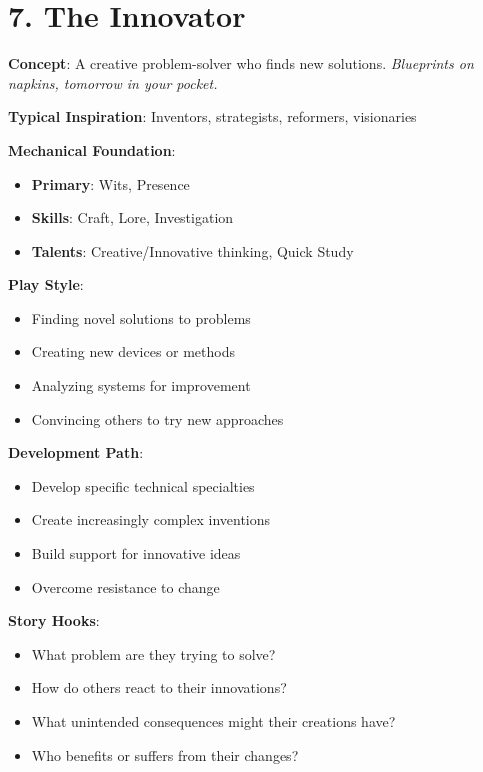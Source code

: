 \section{7. The Innovator}

\textbf{Concept}: A creative problem-solver who finds new solutions. \emph{Blueprints on napkins, tomorrow in your pocket.}

\textbf{Typical Inspiration}: Inventors, strategists, reformers, visionaries

\textbf{Mechanical Foundation}:
\begin{itemize}
\item \textbf{Primary}: Wits, Presence
\item \textbf{Skills}: Craft, Lore, Investigation
\item \textbf{Talents}: Creative/Innovative thinking, Quick Study
\end{itemize}

\textbf{Play Style}:
\begin{itemize}
\item Finding novel solutions to problems
\item Creating new devices or methods
\item Analyzing systems for improvement
\item Convincing others to try new approaches
\end{itemize}

\textbf{Development Path}:
\begin{itemize}
\item Develop specific technical specialties
\item Create increasingly complex inventions
\item Build support for innovative ideas
\item Overcome resistance to change
\end{itemize}

\textbf{Story Hooks}:
\begin{itemize}
\item What problem are they trying to solve?
\item How do others react to their innovations?
\item What unintended consequences might their creations have?
\item Who benefits or suffers from their changes?
\end{itemize}

